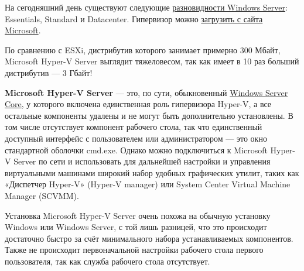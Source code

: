 \documentclass[14pt, a4paper]{article}
\begin{document}
На сегодняшний день существуют следующие \href{https://www.microsoft.com/en-us/cloud-platform/windows-server-pricing}{разновидности Windows Server}: Essentials, Standard и
Datacenter. Гипервизор можно \href{https://www.microsoft.com/en-us/evalcenter/evaluate-hyper-v-server-2019}{загрузить с сайта Microsoft}.

По сравнению с ESXi, дистрибутив которого занимает примерно 300 Мбайт, Microsoft Hyper-V Server
выглядит тяжеловесом, так как имеет в 10 раз больший дистрибутив — 3 Гбайт!

\textbf{Microsoft Hyper-V Server} — это, по сути, обыкновенный \href{https://docs.microsoft.com/ru-ru/windows-server/administration/server-core/what-is-server-core}{Windows Server Core}, у которого включена
единственная роль гипервизора Hyper-V, а все остальные компоненты удалены и не могут быть
дополнительно установлены. В том числе отсутствует компонент рабочего стола, так что
единственный доступный интерфейс с пользователем или администратором — это окно стандартной
оболочки cmd.exe. Однако можно подключиться к Microsoft Hyper-V Server по сети и использовать для
дальнейшей настройки и управления виртуальными машинами широкий набор удобных графических
утилит, таких как «Диспетчер Hyper-V» (Hyper-V manager) или System Center Virtual Machine Manager
(SCVMM).

Установка Microsoft Hyper-V Server очень похожа на обычную установку Windows или Windows Server,
с той лишь разницей, что это происходит достаточно быстро за счёт минимального набора
устанавливаемых компонентов. Также не происходит первоначальной настройки рабочего стола
первого пользователя, так как служба рабочего стола отсутствует.

\begin{figure}[h]%
    \centering
    \label{1.2} %
\end{figure}
\end{document}
